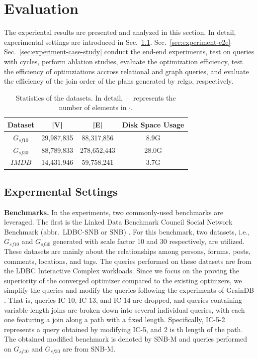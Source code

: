 \section{Evaluation}
The experiental results are presented and analyzed in this section.
In detail, experimental settings are introduced in Sec.~\ref{sec:experiment-settings}.
Sec.~\ref{sec:experiment-e2e}-Sec.~\ref{sec:experiment-case-study} conduct the end-end experiments, test on queries with cycles, perform ablation studies, evaluate the optimization efficiency, test the efficiency of optimziations accross relational and graph queries, and evaluate the efficiency of the join order of the plans generated by relgo, respectively.

\begin{table}[t]
    \centering
    \begin{tabular}{c|c|c|c}
    \hline
    Dataset & |V| & |E| & Disk Space Usage\\ 
    \hline
    $G_{sf10}$& 29,987,835 & 88,317,856 & 8.9G \\
    \hline
    $G_{sf30}$ & 88,789,833 & 278,652,443 & 28.0G\\
    \hline
    $IMDB$ & 14,431,946 & 59,758,241 & 3.7G \\
    \hline
    \end{tabular}
    \caption{Statistics of the datasets. In detail, $|\cdot|$ represents the number of elements in $\cdot$.}
    \label{table:experiment-datasets}
\end{table}

\subsection{Expermental Settings}
\label{sec:experiment-settings}

\textbf{Benchmarks.} In the experiments, two commonly-used benchmarks are leveraged.
The first is the Linked Data Benchmark Council Social Network Benchmark (abbr.~LDBC-SNB or SNB) \cite{ldbc_snb}.
For this benchmark, two datasets, i.e., $G_{sf10}$ and $G_{sf30}$ generated with scale factor 10 and 30 respectively, are utilized.
These datasets are mainly about the relationships among persons, forums, posts, comments, locations, and tags.
The queries performed on these datasets are from the LDBC Interactive Complex workloads.
Since we focus on the proving the superiority of the converged optimizer compared to the existing optimzers, we simplify the queries and modify the queries following the experiments of GrainDB \cite{graindb}.
That is, queries IC-10, IC-13, and IC-14 are dropped, and queries containing variable-length joins are broken down into several individual queries, with each one featuring a join along a path with a fixed length.
Specifically, IC-5-2 represents a query obtained by modifying IC-5, and 2 is th length of the path.
The obtained modified benchmark is denoted by SNB-M and queries performed on $G_{sf10}$ and $G_{sf30}$ are from SNB-M.

